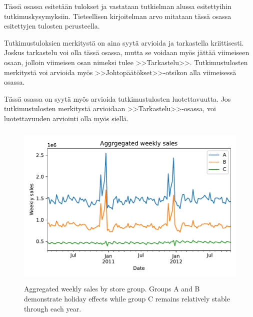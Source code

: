 \documentclass[english, 12pt, a4paper, sci, utf8, a-1b, online]{aaltothesis}
\begin{document}
Tässä osassa esitetään tulokset ja vastataan tutkielman alussa
esitettyihin tutkimuskysymyksiin. Tieteellisen kirjoitelman
arvo mitataan tässä osassa esitettyjen tulosten perusteella. 

Tutkimustuloksien merkitystä on aina syytä arvioida ja tarkastella
kriittisesti.  Joskus tarkastelu voi olla tässä osassa, mutta se
voidaan myös jättää viimeiseen osaan, jolloin viimeisen osan nimeksi
tulee >>Tarkastelu>>. Tutkimustulosten merkitystä voi arvioida myös
>>Johtopäätökset>>-otsikon alla viimeisessä osassa. 

Tässä osassa on syytä myös arvioida tutkimustulosten luotettavuutta.
Jos tutkimustulosten merkitystä arvioidaan >>Tarkastelu>>-osassa,
voi luotettavuuden arviointi olla myös siellä. 



\begin{figure}[htb]
	\centering
	\includegraphics[height=8cm]{../plots/dataset/dataset_plot_y.pdf}
	\caption{Aggregated weekly sales by store group. Groups A and B demonstrate holiday effects while group C remains relatively stable through each year.
	}
	\label{fig:data_y}
\end{figure}
\end{document}
